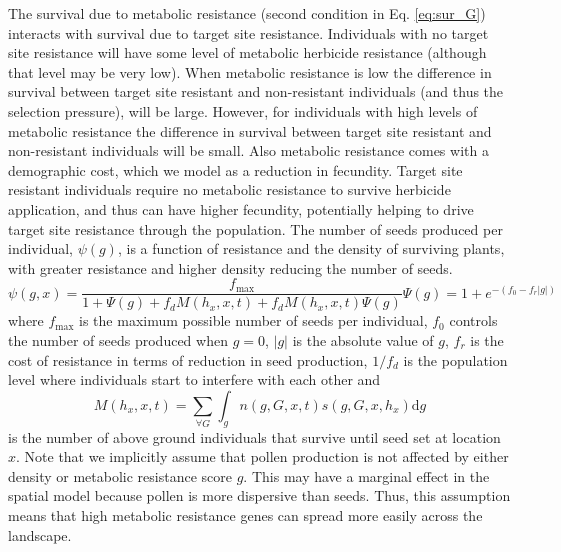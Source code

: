\documentclass[12pt, a4paper]{article}
\begin{document}
The survival due to metabolic resistance (second condition in Eq. \ref{eq:sur_G}) interacts with survival due to target site resistance. Individuals with no target site resistance will have some level of metabolic herbicide resistance (although that level may be very low). When metabolic resistance is low the difference in survival between target site resistant and non-resistant individuals (and thus the selection pressure), will be large. However, for individuals with high levels of metabolic resistance the difference in survival between target site resistant and non-resistant individuals will be small. Also metabolic resistance comes with a demographic cost, which we model as a reduction in fecundity. Target site resistant individuals require no metabolic resistance to survive herbicide application, and thus can have higher fecundity, potentially helping to drive target site resistance through the population. The number of seeds produced per individual, $\psi(g)$, is a function of resistance and the density of surviving plants, with greater resistance and higher density reducing the number of seeds. 
\begin{subequations}
\begin{equation}\label{eq:seed_production}
	\psi(g, x) = \frac{f_\text{max}}{1 + \Psi(g) + f_d M(h_x, x, t) + f_dM(h_x, x, t) \Psi(g)}
\end{equation}  
\begin{equation}
	\Psi(g) = 1 + e^{-(f_0 - f_r|g|)}
\end{equation}
\end{subequations}
where $f_\text{max}$ is the maximum possible number of seeds per individual, $f_0$ controls the number of seeds produced when $g = 0$, $|g|$ is the absolute value of $g$, $f_r$ is the cost of resistance in terms of reduction in seed production, $1/f_d$ is the population level where individuals start to interfere with each other and 
\begin{equation}\label{eq:num_sur}
   M(h_x, x, t) = \sum_{\forall G} \int_g n(g, G, x, t)s(g, G, x, h_x)\text{d}g
\end{equation}
is the number of above ground individuals that survive until seed set at location $x$. Note that we implicitly assume that pollen production is not affected by either density or metabolic resistance score $g$. This may have a marginal effect in the spatial model because pollen is more dispersive than seeds. Thus, this assumption means that high metabolic resistance genes can spread more easily across the landscape.   
\end{document}
